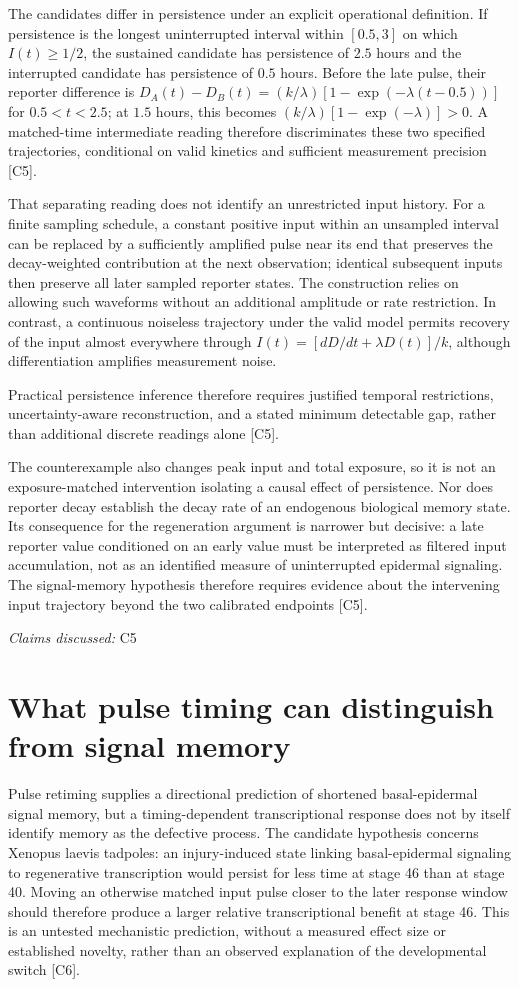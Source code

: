 \documentclass[11pt]{article}
\begin{document}
The candidates differ in persistence under an explicit operational definition. If persistence is the longest uninterrupted interval within $[0.5,3]$ on which $I(t)\geq1/2$, the sustained candidate has persistence of $2.5$ hours and the interrupted candidate has persistence of $0.5$ hours. Before the late pulse, their reporter difference is $D_A(t)-D_B(t)=(k/\lambda)[1-\exp(-\lambda(t-0.5))]$ for $0.5<t<2.5$; at $1.5$ hours, this becomes $(k/\lambda)[1-\exp(-\lambda)]>0$. A matched-time intermediate reading therefore discriminates these two specified trajectories, conditional on valid kinetics and sufficient measurement precision [C5].

That separating reading does not identify an unrestricted input history. For a finite sampling schedule, a constant positive input within an unsampled interval can be replaced by a sufficiently amplified pulse near its end that preserves the decay-weighted contribution at the next observation; identical subsequent inputs then preserve all later sampled reporter states. The construction relies on allowing such waveforms without an additional amplitude or rate restriction. In contrast, a continuous noiseless trajectory under the valid model permits recovery of the input almost everywhere through $I(t)=[dD/dt+\lambda D(t)]/k$, although differentiation amplifies measurement noise.

Practical persistence inference therefore requires justified temporal restrictions, uncertainty-aware reconstruction, and a stated minimum detectable gap, rather than additional discrete readings alone [C5].

The counterexample also changes peak input and total exposure, so it is not an exposure-matched intervention isolating a causal effect of persistence. Nor does reporter decay establish the decay rate of an endogenous biological memory state. Its consequence for the regeneration argument is narrower but decisive: a late reporter value conditioned on an early value must be interpreted as filtered input accumulation, not as an identified measure of uninterrupted epidermal signaling. The signal-memory hypothesis therefore requires evidence about the intervening input trajectory beyond the two calibrated endpoints [C5].

\textit{Claims discussed: }C5
\section{What pulse timing can distinguish from signal memory}
Pulse retiming supplies a directional prediction of shortened basal-epidermal signal memory, but a timing-dependent transcriptional response does not by itself identify memory as the defective process. The candidate hypothesis concerns Xenopus laevis tadpoles: an injury-induced state linking basal-epidermal signaling to regenerative transcription would persist for less time at stage 46 than at stage 40. Moving an otherwise matched input pulse closer to the later response window should therefore produce a larger relative transcriptional benefit at stage 46. This is an untested mechanistic prediction, without a measured effect size or established novelty, rather than an observed explanation of the developmental switch [C6].
\end{document}
